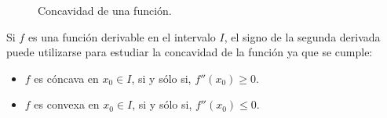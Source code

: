 \begin{figure}[h!]
\centering {}\qquad
{}
\caption{Concavidad de una función.}
\label{g:concavidad_derivada}
\end{figure}


Si $f$ es una función derivable en el intervalo $I$, el signo de la
segunda derivada puede utilizarse para estudiar la concavidad de la
función ya que se cumple:
\begin{itemize}
\item $f$ es cóncava en $x_0\in I$, si y sólo si, $f''(x_0)\geq 0$.
\item $f$ es convexa en $x_0\in I$, si y sólo si, $f''(x_0)\leq 0$.
\end{itemize}

\newpage

